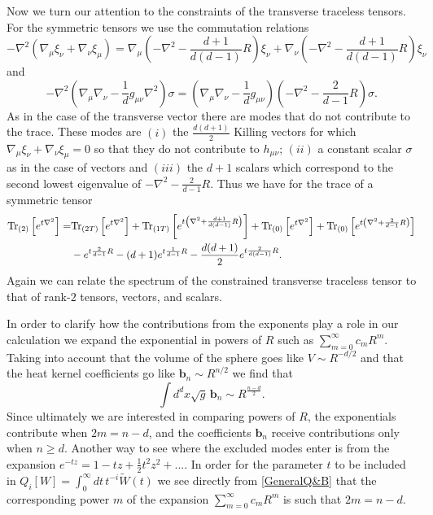 \documentclass[notitlepage,eqsecnum,bm,amsmath,preprintnumbers,superscriptaddress,nofootinbib,aps,11pt]{revtex4-1}
\begin{document}
Now we turn our attention to the constraints of the transverse traceless tensors. For the symmetric tensors we use the 
commutation relations
\begin{equation}
-\nabla^2\left(\nabla_{\mu}\xi_{\nu}+\nabla_{\nu}\xi_{\mu}\right)=\nabla_{\mu}\left(-\nabla^2-\frac{d+1}{d(d-1)}R\right)\xi_{\nu}
+\nabla_{\nu}\left(-\nabla^2-\frac{d+1}{d(d-1)}R\right)\xi_{\nu}
\end{equation}
 and
 \begin{equation}
 -\nabla^2\left(\nabla_{\mu}\nabla_{\nu}-\frac{1}{d}g_{\mu\nu}\nabla^2\right)\sigma=\left(\nabla_{\mu}\nabla_{\nu}
 -\frac{1}{d}g_{\mu\nu}\right)\left(-\nabla^2-\frac{2}{d-1}R\right)\sigma.
 \end{equation}
As in the case of the transverse vector there are modes that do not contribute to the trace. These modes are $(i)$ the 
$\frac{d(d+1)}{2}$ Killing vectors for which $\nabla_{\mu}\xi_{\nu}+\nabla_{\nu}\xi_{\mu}=0$ so that they do not contribute to 
$h_{\mu\nu}$; $(ii)$ a constant scalar $\sigma$ as in the case of vectors and $(iii)$ the $d+1$ scalars which correspond to the
second lowest eigenvalue of $-\nabla^2-\frac{2}{d-1}R$. Thus we have for the trace of a symmetric tensor
\begin{equation}
\begin{split}
\textnormal{Tr}_{(2)}\left[e^{t\nabla^2}\right]=&\textnormal{Tr}_{(2T)}\left[e^{t\nabla^2}\right]+\textnormal{Tr}_{(1T)}\left[e^{t\left(\nabla^2+\frac{d+1}{d(d-1)}R\right)}\right]+\textnormal{Tr}_{(0)}\left[e^{t\nabla^2}\right]+\textnormal{Tr}_{(0)}\left[e^{t\left(\nabla^2+\frac{2}{d-1}R\right)}\right]\\
&-e^{t\frac{2}{d-1}R}-(d+1)e^{t\frac{1}{d-1}R}-\frac{d(d+1)}{2}e^{t\frac{2}{d(d-1)}R}.
\end{split}
\end{equation}
Again we can relate the spectrum of the constrained transverse traceless tensor to that of  rank-$2$ tensors, vectors, and scalars.

In order to clarify how the contributions from the exponents play a role in our calculation we expand the exponential in 
powers of $R$ such as $\sum_{m=0}^{\infty}c_mR^m$. Taking into account that the volume of the sphere goes like $V\sim R^{-d/2}$ 
and that the heat kernel coefficients go like $\mathbf{b}_n\sim R^{n/2}$ we find that
\begin{equation}
\int d^dx\sqrt{g}\,\mathbf{b}_n\sim R^{\frac{n-d}{2}}.
\end{equation}
Since ultimately we are interested in comparing powers of $R$, the exponentials contribute when $2m=n-d$,
and the coefficients $\mathbf{b}_n$ receive contributions only when $n\geq d$. Another way to see where the excluded modes enter is from the expansion $e^{-tz}=1-tz+\frac{1}{2}t^2z^2+...$. In order for the parameter $t$ to be included in $Q_i[W]=\int_0^{\infty}dt\,t^{-i}\tilde W(t)$ we see directly from \eqref{GeneralQ&B} that the corresponding power $m$ of the expansion $\sum_{m=0}^{\infty}c_mR^m$ is such that $2m=n-d$. 
\end{document}
